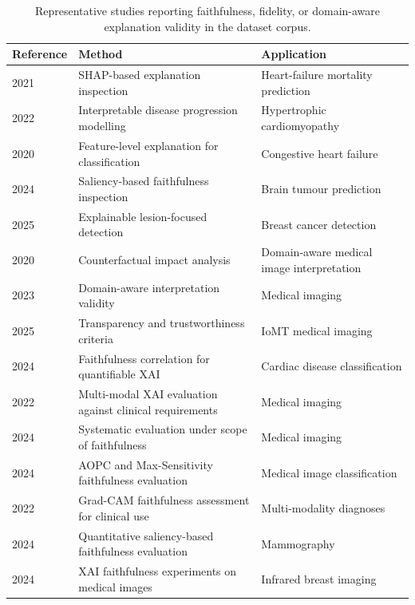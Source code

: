 \setcounter{table}{2}
\begin{table}[H]
\centering
\caption{Representative studies reporting faithfulness, fidelity, or domain-aware explanation validity in the dataset corpus.}
\label{tab:faithfulness_metrics}
\renewcommand{\arraystretch}{1.2}
\begin{tabularx}{\linewidth}{>{\raggedright\arraybackslash}p{2.5cm} >{\raggedright\arraybackslash}X >{\raggedright\arraybackslash}X}
\hline
\textbf{Reference} & \textbf{Method} & \textbf{Application} \\
\hline
\cite{Vazquez2021} 2021       & SHAP-based explanation inspection               & Heart-failure mortality prediction \\
\cite{Piculin2022} 2022       & Interpretable disease progression modelling     & Hypertrophic cardiomyopathy \\
\cite{Li2020} 2020            & Feature-level explanation for classification    & Congestive heart failure \\
\cite{Nazir2024UtilizingCC} 2024 & Saliency-based faithfulness inspection       & Brain tumour prediction \\
\cite{saharan2025explainable} 2025 & Explainable lesion-focused detection        & Breast cancer detection \\
\cite{lenis2020domain} 2020   & Counterfactual impact analysis                  & Domain-aware medical image interpretation \\
\cite{10051650} 2023          & Domain-aware interpretation validity            & Medical imaging \\
\cite{10328849} 2025          & Transparency and trustworthiness criteria       & IoMT medical imaging \\
\cite{Pandey2024} 2024        & Faithfulness correlation for quantifiable XAI  & Cardiac disease classification \\
\cite{jin2022evaluating} 2022 & Multi-modal XAI evaluation against clinical requirements & Medical imaging \\
\cite{lamprou2024evaluation} 2024 & Systematic evaluation under scope of faithfulness & Medical imaging \\
\cite{Patricio2024} 2024      & AOPC and Max-Sensitivity faithfulness evaluation & Medical image classification \\
\cite{chien2022usefulness} 2022 & Grad-CAM faithfulness assessment for clinical use & Multi-modality diagnoses \\
\cite{cerekci2024quantitative} 2024 & Quantitative saliency-based faithfulness evaluation & Mammography \\
\cite{raghavan2024explainable} 2024 & XAI faithfulness experiments on medical images & Infrared breast imaging \\
\hline
\end{tabularx}
\end{table}
